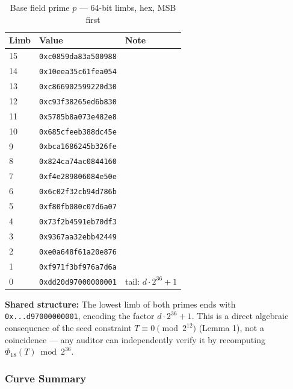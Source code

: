 \begin{table}[t]
\centering
\caption{Base field prime \(p\) --- 64-bit limbs, hex, MSB first}
\begin{tabular}{lll}
\toprule
Limb & Value & Note \\
\midrule
15 & \texttt{0xc0859da83a500988} &  \\
14 & \texttt{0x10eea35c61fea054} &  \\
13 & \texttt{0xc866902599220d30} &  \\
12 & \texttt{0xc93f38265ed6b830} &  \\
11 & \texttt{0x5785b8a073e482e8} &  \\
10 & \texttt{0x685cfeeb388dc45e} &  \\
9 & \texttt{0xbca1686245b326fe} &  \\
8 & \texttt{0x824ca74ac0844160} &  \\
7 & \texttt{0xf4e289806084e50e} &  \\
6 & \texttt{0x6c02f32cb94d786b} &  \\
5 & \texttt{0xf80fb080c07d6a07} &  \\
4 & \texttt{0x73f2b4591eb70df3} &  \\
3 & \texttt{0x9367aa32ebb42449} &  \\
2 & \texttt{0xe0a648f61a20e876} &  \\
1 & \texttt{0xf971f3bf976a7d6a} &  \\
0 & \texttt{0xdd20d97000000001} & tail: \(d \cdot 2^{36} + 1\) \\
\bottomrule
\end{tabular}
\end{table}

\textbf{Shared structure:} The lowest limb of both primes ends with
\texttt{0x...d97000000001}, encoding the factor \(d \cdot 2^{36} + 1\).
This is a direct algebraic consequence of the seed constraint
\(T \equiv 0 \pmod{2^{12}}\) (Lemma 1), not a coincidence --- any
auditor can independently verify it by recomputing
\(\Phi_{18}(T) \bmod 2^{36}\).

\subsubsection{Curve Summary}\label{curve-summary}

